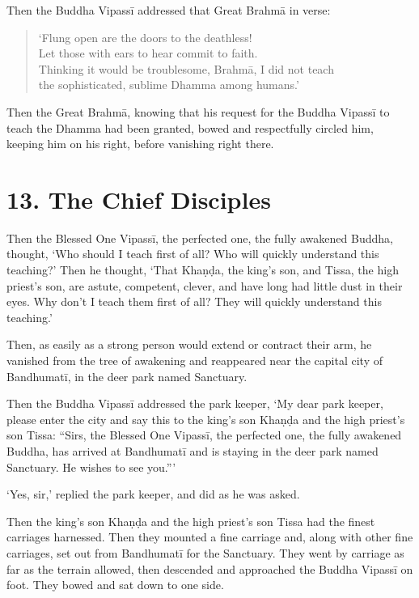 \documentclass[12pt,openany]{book}%
\begin{document}
Then the Buddha \textsanskrit{Vipassī} addressed that Great \textsanskrit{Brahmā} in verse: 

\begin{verse}%
‘Flung open are the doors to the deathless! \\
Let those with ears to hear commit to faith. \\
Thinking it would be troublesome, \textsanskrit{Brahmā}, I did not teach \\
the sophisticated, sublime Dhamma among humans.’ 

%
\end{verse}

Then the Great \textsanskrit{Brahmā}, knowing that his request for the Buddha \textsanskrit{Vipassī} to teach the Dhamma had been granted, bowed and respectfully circled him, keeping him on his right, before vanishing right there. 

\section*{13. The Chief Disciples }

Then the Blessed One \textsanskrit{Vipassī}, the perfected one, the fully awakened Buddha, thought, ‘Who should I teach first of all? Who will quickly understand this teaching?’ Then he thought, ‘That \textsanskrit{Khaṇḍa}, the king’s son, and Tissa, the high priest’s son, are astute, competent, clever, and have long had little dust in their eyes. Why don’t I teach them first of all? They will quickly understand this teaching.’ 

Then, as easily as a strong person would extend or contract their arm, he vanished from the tree of awakening and reappeared near the capital city of \textsanskrit{Bandhumatī}, in the deer park named Sanctuary. 

Then the Buddha \textsanskrit{Vipassī} addressed the park keeper, ‘My dear park keeper, please enter the city and say this to the king’s son \textsanskrit{Khaṇḍa} and the high priest’s son Tissa: “Sirs, the Blessed One \textsanskrit{Vipassī}, the perfected one, the fully awakened Buddha, has arrived at \textsanskrit{Bandhumatī} and is staying in the deer park named Sanctuary. He wishes to see you.”’ 

‘Yes, sir,’ replied the park keeper, and did as he was asked. 

Then the king’s son \textsanskrit{Khaṇḍa} and the high priest’s son Tissa had the finest carriages harnessed. Then they mounted a fine carriage and, along with other fine carriages, set out from \textsanskrit{Bandhumatī} for the Sanctuary. They went by carriage as far as the terrain allowed, then descended and approached the Buddha \textsanskrit{Vipassī} on foot. They bowed and sat down to one side. 
\end{document}
